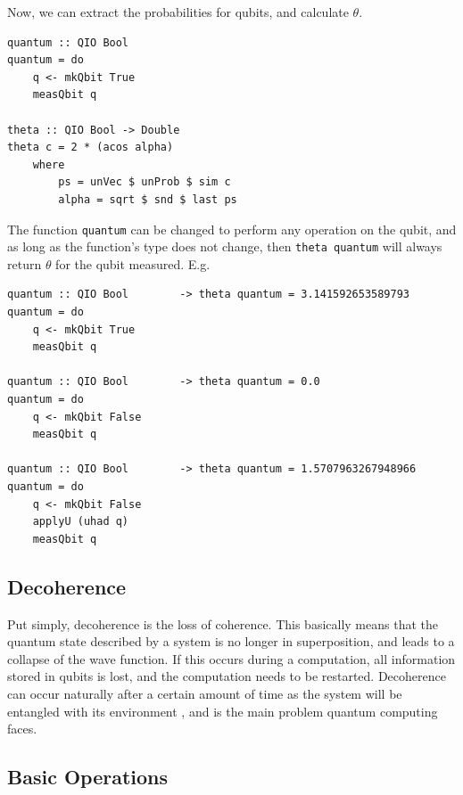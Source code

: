 \documentclass[a4paper,10pt, titlepage, twoside]{article}
\begin{document}
Now, we can extract the probabilities for qubits, and calculate $\theta$.
\begin{verbatim}
quantum :: QIO Bool
quantum = do
    q <- mkQbit True
    measQbit q
    
theta :: QIO Bool -> Double
theta c = 2 * (acos alpha)
    where
        ps = unVec $ unProb $ sim c
        alpha = sqrt $ snd $ last ps
\end{verbatim}
The function \texttt{quantum} can be changed to perform any operation on the qubit, and as long as the function's type does not change, then \texttt{theta quantum} will always return $\theta$ for the qubit measured. E.g.
\begin{verbatim}
quantum :: QIO Bool        -> theta quantum = 3.141592653589793
quantum = do
    q <- mkQbit True
    measQbit q

quantum :: QIO Bool        -> theta quantum = 0.0
quantum = do
    q <- mkQbit False
    measQbit q

quantum :: QIO Bool        -> theta quantum = 1.5707963267948966
quantum = do
    q <- mkQbit False
    applyU (uhad q)
    measQbit q
\end{verbatim}

\subsection{Decoherence}
Put simply, decoherence is the loss of coherence. This basically means that the quantum state described by a system is no longer in superposition, and leads to a collapse of the wave function. If this occurs during a computation, all information stored in qubits is lost, and the computation needs to be restarted. Decoherence can occur naturally after a certain amount of time as the system will be entangled with its environment \cite{decoherence}, and is the main problem quantum computing faces.

\subsection{Basic Operations}
\end{document}
